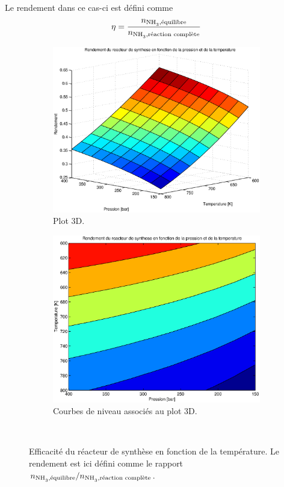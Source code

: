 Le rendement dans ce cas-ci est défini comme 
\[ \eta = \frac{n_{\ce{NH3},\text{équilibre}}}{n_{\ce{NH3},\text{réaction complète}}} \]

\begin{figure}
	\centering
	\begin{subfigure}[b]{1\textwidth}
		\includegraphics[scale=0.7]{../tache2/img/efficienceSyntheseSnoPurge.eps}
		\caption{Plot 3D.}
		\label{fig:efficienceSnoPurge}
	\end{subfigure}
	\begin{subfigure}[b]{0.8\textwidth}
		\includegraphics[scale=0.6]{../tache2/img/efficienceSyntheseCnoPurge.eps}
		\caption{Courbes de niveau associés au plot 3D.}
		\label{fig:efficienceCnoPurge}
	\end{subfigure} \\
	\caption{Efficacité du réacteur de synthèse en fonction de la température.
		Le rendement est ici défini comme le rapport $n_{\ce{NH3},\text{équilibre}}/
		n_{\ce{NH3},\text{réaction complète}}$.}
\end{figure}


